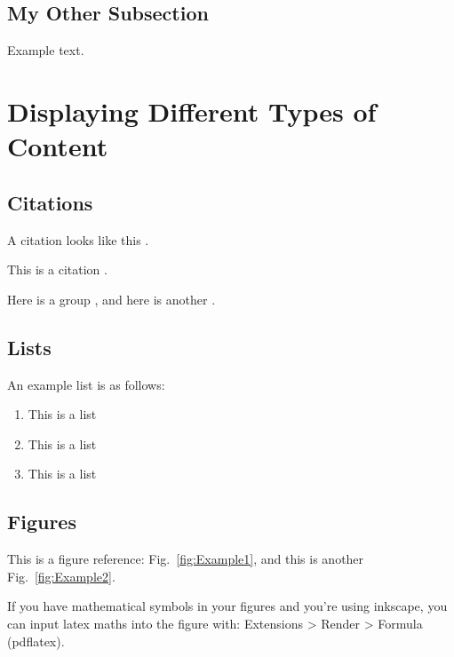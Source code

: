\documentclass[preprint,3p,11pt,sort]{elsarticle}
\newcommand{\figref}[1]{Fig.~\ref{#1}}
\begin{document}
\subsection{My Other Subsection} \label{ssec:mySubsectionB}
Example text.


\section{Displaying Different Types of Content} \label{sec:ContentTypes}


\subsection{Citations}
A citation looks like this \cite{example2}.

This is a citation \cite{example1}.

Here is a group \cite{example4,example5}, and here is another \cite{example3,example4,example5}.


\subsection{Lists}
An example list is as follows:

\begin{enumerate}
    \item This is a list
    \item This is a list
    \item This is a list
\end{enumerate}


\subsection{Figures}
This is a figure reference: \figref{fig:Example1}, and this is another \figref{fig:Example2}.

If you have mathematical symbols in your figures and you're using inkscape, you can input latex maths into the figure with: Extensions > Render > Formula (pdflatex).
\end{document}
